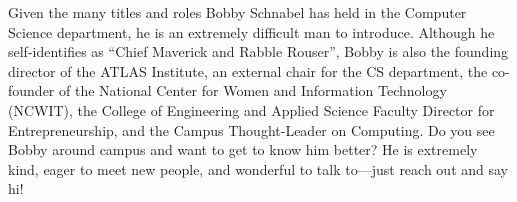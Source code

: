 \documentclass[12pt]{amsart}
\begin{document}
\begin{multicols}{2}
\begin{figure}[H]
    \setlength{\fboxsep}{8pt}
\end{figure}

Given the many titles and roles Bobby Schnabel has held in the
Computer Science department, he is an extremely difficult man to
introduce.  Although he self-identifies as “Chief Maverick and
Rabble Rouser”, Bobby is also the founding director of the ATLAS
Institute, an external chair for the CS department, the co-founder of
the National Center for Women and Information Technology (NCWIT),
the College of Engineering and Applied Science Faculty Director for
Entrepreneurship, and the Campus Thought-Leader on Computing.
Do you see Bobby around campus and want to get to know him
better? He is extremely kind, eager to meet new people, and
wonderful to talk to—just reach out and say hi! 


\end{multicols}
\end{document}
